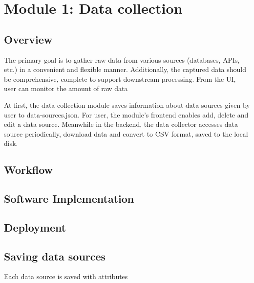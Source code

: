 

\section{Module 1: Data collection}

\subsection{Overview}
The primary goal is to gather raw data from various sources (databases, APIs, etc.) in a convenient and flexible manner. Additionally, the captured data should be comprehensive, complete to support downstream processing.
From the UI, user can monitor the amount of raw data 

At first, the data collection module saves information about data sources given by user to data-sources.json. 
For user, the module's frontend enables add, delete and edit a data source. Meanwhile in the backend, the data collector accesses data source periodically, download data and convert to CSV format, saved to the local disk.

\subsection{Workflow}

\subsection{Software Implementation}

\subsection{Deployment}

\subsection{Saving data sources}
Each data source is saved with attributes

